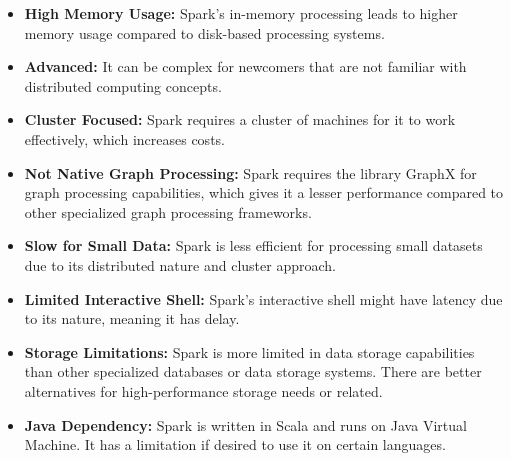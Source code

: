 \begin{itemize}
    \item \textbf{High Memory Usage:} Spark's in-memory processing leads to
    higher memory usage compared to disk-based processing systems.
    \item \textbf{Advanced:} It can be complex for newcomers that are not
    familiar with distributed computing concepts.
    \item \textbf{Cluster Focused:} Spark requires a cluster of machines for it
    to work effectively, which increases costs.
    \item \textbf{Not Native Graph Processing:} Spark requires the library
    GraphX for graph processing capabilities, which gives it a lesser
    performance compared to other specialized graph processing frameworks.
    \item \textbf{Slow for Small Data:} Spark is less efficient for processing
    small datasets due to its distributed nature and cluster approach.
    \item \textbf{Limited Interactive Shell:} Spark's interactive shell might
    have latency due to its nature, meaning it has delay.
    \item \textbf{Storage Limitations:} Spark is more limited in data storage
    capabilities than other specialized databases or data storage systems. There
    are better alternatives for high-performance storage needs or related.
    \item \textbf{Java Dependency:} Spark is written in Scala and runs on Java
    Virtual Machine. It has a limitation if desired to use it on certain
    languages.
\end{itemize}